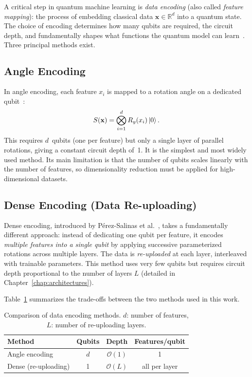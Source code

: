 A critical step in quantum machine learning is \emph{data encoding} (also called \emph{feature mapping}): the process of embedding classical data $\mathbf{x} \in \mathbb{R}^d$ into a quantum state. The choice of encoding determines how many qubits are required, the circuit depth, and fundamentally shapes what functions the quantum model can learn~\cite{larose2020robust, schuld2021effect}. Three principal methods exist.

\subsection{Angle Encoding}

In angle encoding, each feature $x_i$ is mapped to a rotation angle on a dedicated qubit~\cite{schuld2020circuit}:
\begin{equation}
    S(\mathbf{x}) = \bigotimes_{i=1}^{d} R_y(x_i)\ket{0}.
    \label{eq:angle_encoding}
\end{equation}
This requires $d$~qubits (one per feature) but only a single layer of parallel rotations, giving a constant circuit depth of~1. It is the simplest and most widely used method. Its main limitation is that the number of qubits scales linearly with the number of features, so dimensionality reduction must be applied for high-dimensional datasets.

\subsection{Dense Encoding (Data Re-uploading)}

Dense encoding, introduced by P\'erez-Salinas et al.~\cite{perez2020data}, takes a fundamentally different approach: instead of dedicating one qubit per feature, it encodes \emph{multiple features into a single qubit} by applying successive parameterized rotations across multiple layers. The data is \emph{re-uploaded} at each layer, interleaved with trainable parameters. This method uses very few qubits but requires circuit depth proportional to the number of layers $L$ (detailed in Chapter~\ref{chap:architectures}).

Table~\ref{tab:encoding} summarizes the trade-offs between the two methods used in this work.

\begin{table}[ht]
    \centering
    \begin{tabular}{lccc}
        \toprule
        \textbf{Method} & \textbf{Qubits} & \textbf{Depth} & \textbf{Features/qubit} \\
        \midrule
        Angle encoding       & $d$ & $\mathcal{O}(1)$ & 1 \\
        Dense (re-uploading) & 1   & $\mathcal{O}(L)$ & all per layer \\
        \bottomrule
    \end{tabular}
    \caption{Comparison of data encoding methods. $d$: number of features, $L$: number of re-uploading layers.}
    \label{tab:encoding}
\end{table}

